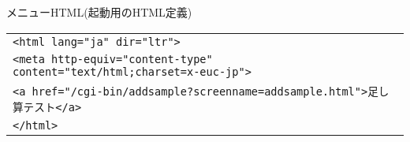 {\gt メニューHTML(起動用のHTML定義)}

\begin{tabular}{|l|}
\hline
\verb+<html lang="ja" dir="ltr">+\\
\verb+<meta http-equiv="content-type" content="text/html;charset=x-euc-jp">+\\
\verb+<a href="/cgi-bin/addsample?screenname=addsample.html">足し算テスト</a>+\\
\verb+</html>+\\
\hline
\end{tabular}